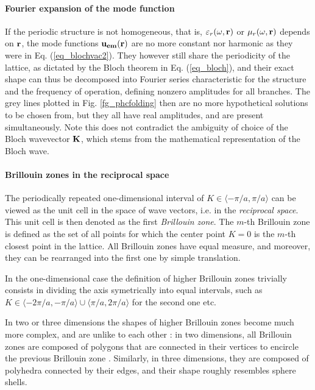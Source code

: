 \paragraph{Fourier expansion of the mode function}%
If the periodic structure is not homogeneous, that is, $\varepsilon_r(\omega,{\mathbf{r}})$ or $\mu_r(\omega,{\mathbf{r}})$ depends on ${\mathbf{r}}$, the mode functions $\mathbf{u_{em}}({\mathbf{r}})$ are no more constant nor harmonic as they were in Eq. (\ref{eq_blochvac2}). They however still share the periodicity of the lattice, as dictated by the Bloch theorem in Eq. (\ref{eq_bloch}), and their exact shape can thus be decomposed into Fourier series
characteristic for the structure and the frequency of operation, defining nonzero amplitudes for all branches. The grey lines plotted in Fig. \ref{fg_phcfolding} then are no more hypothetical solutions to be chosen from, but they all have real amplitudes, and are present simultaneously. 
Note this does not contradict the ambiguity of choice of the Bloch wavevector ${\mathbf{K}}$, which stems from the  mathematical representation of the Bloch wave.

\paragraph{Brillouin zones in the reciprocal space} %
The periodically repeated one-dimensional interval of $K\in\langle-\pi/a, \pi/a\rangle$ can be viewed as the unit cell in the space of wave vectors, i.e. in the \textit{reciprocal space}. This unit cell is then denoted as the first \textit{Brillouin zone}.  
The $m$-th Brillouin zone is defined as the set of all points for which the center point $K=0$ is the $m$-th closest point in the lattice. 
All Brillouin zones have equal measure, and moreover, they can be rearranged into the first one by simple translation. %

In the one-dimensional case the definition of higher Brillouin zones trivially consists in dividing the axis symetrically into equal intervals, such as $K\in\langle-2\pi/a, -\pi/a\rangle \cup \langle \pi/a, 2\pi/a\rangle$ for the second one etc. 

In two or three dimensions the shapes of higher Brillouin zones become much more complex, and are unlike to each other \cite[pp. 134--135]{klingshirn2007semiconductor}: in two dimensions, all Brillouin zones are composed of polygons that are connected in their vertices to encircle the previous Brillouin zone \cite[p. 126]{brillouin2003wave}. Similarly, in three dimensions, they are composed of polyhedra connected by their edges, and their shape roughly resembles sphere shells. 

